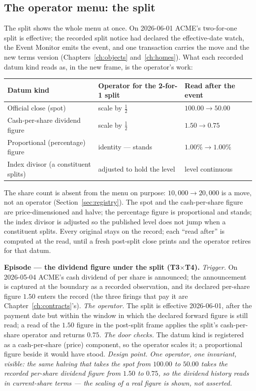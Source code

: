 \subsection{The operator menu: the split}\label{sec:menu}

The split shows the whole menu at once. On 2026-06-01 ACME's two-for-one split is
effective; the recorded split notice had declared the effective-date watch, the Event
Monitor emits the event, and one transaction carries the move and the new terms version
(Chapters~\ref{ch:objects} and~\ref{ch:homes}). What each recorded datum kind reads as, in
the new frame, is the operator's work:

\begin{center}
\begin{tabular}{@{}lll@{}}
\toprule
Datum kind & Operator for the 2-for-1 split & Read after the event \\
\midrule
Official close (spot) & scale by $\tfrac12$ & $100.00 \rightarrow 50.00$ \\
Cash-per-share dividend figure & scale by $\tfrac12$ & $1.50 \rightarrow 0.75$ \\
Proportional (percentage) figure & identity --- stands & $1.00\% \rightarrow 1.00\%$ \\
Index divisor (a constituent splits) & adjusted to hold the level & level continuous \\
\bottomrule
\end{tabular}
\end{center}

\noindent The share count is absent from the menu on purpose: $10{,}000 \rightarrow
20{,}000$ is a move, not an operator (Section~\ref{sec:registry}). The spot and the
cash-per-share figure are price-dimensioned and halve; the percentage figure is
proportional and stands; the index divisor is adjusted so the published level does not jump
when a constituent splits. Every original stays on the record; each ``read after'' is
computed at the read, until a fresh post-split close prints and the operator retires for
that datum.

\medskip\noindent\textbf{Episode --- the dividend figure under the split (T3$\times$T4).}
\emph{Trigger.} On 2026-05-04 ACME's cash dividend of  per share is announced;
the announcement is captured at the boundary as a recorded observation, and its declared
per-share figure $1.50$ enters the record (the three firings that pay it are
Chapter~\ref{ch:contracts}'s). \emph{The operator.} The split is effective 2026-06-01,
after the payment date but within the window in which the declared forward figure is still
read; a read of the $1.50$ figure in the post-split frame applies the split's
cash-per-share operator and returns $0.75$. \emph{The door checks.} The datum kind is
registered as a cash-per-share (price) component, so the operator scales it; a proportional
figure beside it would have stood. \emph{Design point.} \emph{One operator, one invariant,
visible: the same halving that takes the spot from $100.00$ to $50.00$ takes the recorded
per-share dividend figure from $1.50$ to $0.75$, so the dividend history reads in
current-share terms --- the scaling of a real figure is shown, not asserted.}


